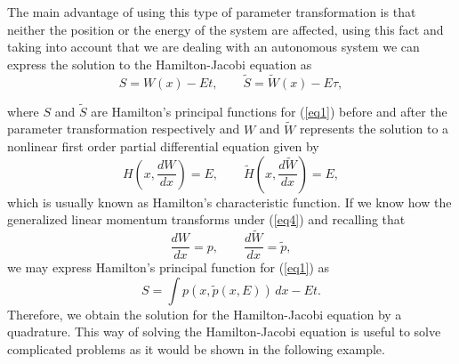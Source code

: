The main advantage of using this type of parameter transformation
is that neither the position or the energy of the system are
affected, using this fact and taking into account that we are
dealing with an autonomous system we can express the solution to
the Hamilton-Jacobi equation as \cite{B1}
\begin{equation}
S=W(x)-Et, \qquad \tilde{S}=\tilde{W}(x)-E\tau, \label{eq5}
\end{equation}

where $S$ and $\tilde{S}$ are Hamilton's principal functions for
(\ref{eq1}) before and after the parameter transformation
respectively and $W$ and $\tilde{W}$ represents the solution to a
nonlinear first order partial differential equation given by
\cite{B1}
\begin{equation}
H\left(x,\frac{dW}{dx}\right)=E, \qquad
\tilde{H}\left(x,\frac{d\tilde{W}}{dx}\right)=E, \label{eq6}
\end{equation}
which is usually known as Hamilton's characteristic function. If
we know how the generalized linear momentum transforms under
(\ref{eq4}) and recalling that
\begin{equation}
\frac{dW}{dx}=p, \qquad \frac{d\tilde{W}}{dx}=\tilde{p},
\label{eq7}
\end{equation}
we may express Hamilton's principal function for (\ref{eq1}) as
\begin{equation}
S=\int p(x,\tilde{p}(x,E))\,dx-Et. \label{eq8}
\end{equation}
Therefore, we obtain the solution for the Hamilton-Jacobi equation
by a quadrature. This way of solving the Hamilton-Jacobi equation
is useful to solve complicated problems as it would be shown in
the following example.
